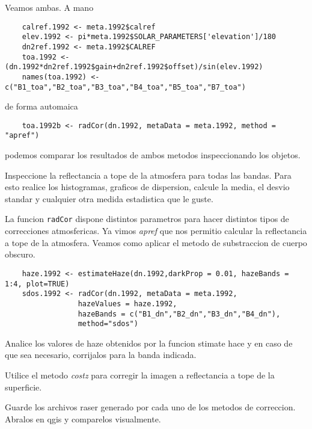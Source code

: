 Veamos ambas. A mano

\begin{lstlisting}
    calref.1992 <- meta.1992$calref
    elev.1992 <- pi*meta.1992$SOLAR_PARAMETERS['elevation']/180
    dn2ref.1992 <- meta.1992$CALREF
    toa.1992 <- (dn.1992*dn2ref.1992$gain+dn2ref.1992$offset)/sin(elev.1992)
    names(toa.1992) <- c("B1_toa","B2_toa","B3_toa","B4_toa","B5_toa","B7_toa")
\end{lstlisting}

de forma automaica

\begin{lstlisting}
    toa.1992b <- radCor(dn.1992, metaData = meta.1992, method = "apref")
\end{lstlisting}

podemos comparar los resultados de ambos metodos inspeccionando los objetos.

\begin{act}
    Inspeccione la reflectancia a tope de la atmosfera para todas las bandas.
    Para esto realice los histogramas, graficos de dispersion, calcule la media,
    el desvio standar y cualquier otra medida estadistica que le guste.
\end{act}

La funcion \texttt{radCor} dispone distintos parametros para hacer distintos
tipos de correcciones atmosfericas. Ya vimos \emph{apref} que nos permitio
calcular la reflectancia a tope de la atmosfera. Veamos como aplicar el metodo
de substraccion de cuerpo obscuro.

\begin{lstlisting}
    haze.1992 <- estimateHaze(dn.1992,darkProp = 0.01, hazeBands = 1:4, plot=TRUE)
    sdos.1992 <- radCor(dn.1992, metaData = meta.1992, 
                 hazeValues = haze.1992,
                 hazeBands = c("B1_dn","B2_dn","B3_dn","B4_dn"), 
                 method="sdos")
\end{lstlisting}

\begin{act}
    Analice los valores de haze obtenidos por la funcion stimate hace y en caso
    de que sea necesario, corrijalos para la banda indicada.
\end{act}

\begin{act}
    Utilice el metodo \emph{costz} para corregir la imagen a reflectancia a tope
    de la superficie.
\end{act}

\begin{act}
    Guarde los archivos raser generado por cada uno de los metodos de
    correccion. Abralos en qgis y comparelos visualmente.    
\end{act}


